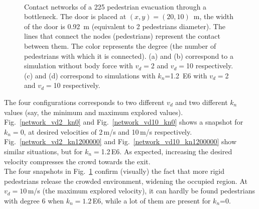 \documentclass[preprint,12pt]{elsarticle}
\begin{document}
\begin{figure}[!htbp]
    \\
\caption[width=0.47\columnwidth]{Contact networks of a 225 pedestrian evacuation through a bottleneck. The door is placed at $(x,y)=(20,10)$~m, the width of the door is 0.92~m (equivalent to 2 pedestrian\textsc{}s diameter). The lines that connect the nodes (pedestrians) represent the contact between them. The color represents the degree (the number of pedestrians with which it is connected). (a) and (b) correspond to a simulation without body force with $v_d=$2 and $v_d=$10 respectively. (c) and (d) correspond to simulations with $k_n$=1.2~E6 with $v_d=$2 and $v_d=$10 respectively.}
\label{network_bottleneck}
\end{figure}



The four configurations corresponds to two different $v_d$ and two different $k_n$ values (say, the  minimum and maximum explored values). Fig.~\ref{network_vd2_kn0} and Fig.~\ref{network_vd10_kn0} shows a snapshot for $k_n=$0, at desired velocities of 2$\,$m/s and 10$\,$m/s respectively.    Fig.~\ref{network_vd2_kn1200000} and Fig.~\ref{network_vd10_kn1200000} show similar situations, but for  $k_n=$1.2$\,$E6. As expected, increasing the desired velocity compresses the crowd towards the exit. \\

The four snapshots in Fig.~\ref{network_bottleneck} confirm (visually) the fact that more rigid pedestrians release the crowded environment, widening the occupied region. At $v_d=10\,$m/s (the maximum explored velocity), it can hardly be found pedestrians with degree 6 when $k_n=1.2\,$E6, while a lot of them are present for $k_n$=0.\\
\end{document}
